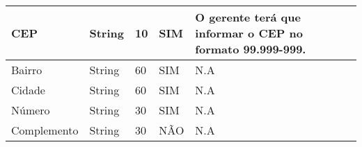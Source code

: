 \begin{enumerate}[label=RN\arabic*]
\begin{table}[htb]
\begin{tabular}{|p{3.0cm}|p{2.0cm}|p{1.5cm}|p{2.0cm}|p{5.75cm}|}
			CEP            & String        & 10               & SIM                  & O gerente terá que informar o CEP no formato \textbf{99.999-999}.                    \\ \hline
			Bairro         & String        & 60               & SIM                  & N.A                                                                                  \\ \hline
			Cidade         & String        & 60               & SIM                  & N.A                                                                                  \\ \hline
			Número         & String        & 30               & SIM                  & N.A                                                                                  \\ \hline
			Complemento    & String        & 30               & NÃO                  & N.A                                                                                  \\ \hline
		\end{tabular}
	\end{table}
\end{enumerate}